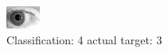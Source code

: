 \begin{figure}[h!]
\begin{center}
\includegraphics[width=0.60\columnwidth]{figures/ID256_class_4_target_3.png}
\end{center}
\caption{ Classification: 4 actual target: 3}
\label{fig:ID256_class_4_target_3}
\end{figure}
